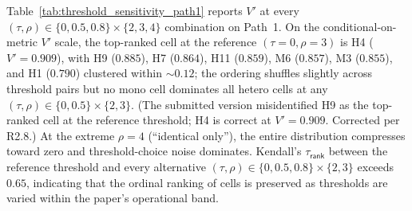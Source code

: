 Table~\ref{tab:threshold_sensitivity_path1} reports $V'$ at every
$(\tau, \rho) \in \{0, 0.5, 0.8\} \times \{2, 3, 4\}$ combination on
Path~1. On the conditional-on-metric $V'$ scale, the top-ranked cell at
the reference $(\tau = 0, \rho = 3)$ is H4 ($V' = 0.909$), with H9
($0.885$), H7 ($0.864$), H11 ($0.859$), M6 ($0.857$), M3 ($0.855$),
and H1 ($0.790$) clustered within $\sim$$0.12$; the ordering shuffles
slightly across threshold pairs but no mono cell dominates all hetero
cells at any $(\tau, \rho) \in \{0, 0.5\} \times \{2, 3\}$.
(The submitted version misidentified H9 as the top-ranked cell at the
reference threshold; H4 is correct at $V' = 0.909$. Corrected per R2.8.) At the extreme
$\rho = 4$ (``identical only''), the entire distribution compresses
toward zero and threshold-choice noise dominates. Kendall's
$\tau_{\textsf{rank}}$ between the reference threshold and every
alternative $(\tau, \rho) \in \{0, 0.5, 0.8\} \times \{2, 3\}$ exceeds
$0.65$, indicating that the ordinal ranking of cells is preserved as
thresholds are varied within the paper's operational band.

